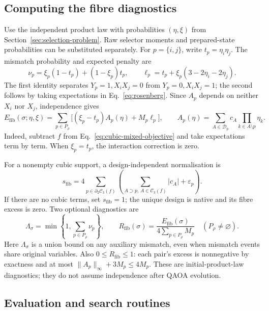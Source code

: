\documentclass[a4paper,onecolumn,11pt,unpublished]{quantumarticle}
\theoremstyle{remark}
\begin{document}
\subsection{Computing the fibre diagnostics}
\label{app:fibre-risk}

Use the independent product law with probabilities $(\eta,\xi)$ from
Section~\ref{sec:selection-problem}. Raw selector moments and prepared-state
probabilities can be substituted separately.
For $p=\{i,j\}$, write $t_p=\eta_i\eta_j$.  The mismatch probability and
expected penalty are
\begin{equation}
\nu_p=\xi_p(1-t_p)+(1-\xi_p)t_p,
\qquad
\ell_p=t_p+\xi_p(3-2\eta_i-2\eta_j).
\label{eq:fibre-violation-probability}
\end{equation}
The first identity separates $Y_p=1,X_iX_j=0$ from $Y_p=0,X_iX_j=1$;
the second follows by taking expectations in Eq.~\eqref{eq:rosenberg}.
Since $A_p$ depends on neither $X_i$ nor $X_j$, independence gives
\begin{equation}
E_{\mathrm{fib}}(\sigma;\eta,\xi)
=\sum_{p\in P_\rho}\bigl[(\xi_p-t_p)A_p(\eta)+M_p\ell_p\bigr],
\qquad
A_p(\eta)=\sum_{A\in\mathcal D_p}c_A\prod_{k\in A\setminus p}\eta_k.
\label{eq:fibre-excess-full}
\end{equation}
Indeed, subtract $f$ from Eq.~\eqref{eq:cubic-mixed-objective} and take
expectations term by term.  When $\xi_p=t_p$, the interaction correction is zero.

For a nonempty cubic support, a design-independent normalisation is
\[
s_{\mathrm{fib}}=4\sum_{p\in\partial_2\mathcal C_3(f)}
\left(\sum_{A\supset p,\,A\in\mathcal C_3(f)}|c_A|+\varepsilon_p\right).
\]
If there are no cubic terms, set $s_{\mathrm{fib}}=1$; the unique design is
native and its fibre excess is zero.  Two optional diagnostics are
\[
\Lambda_\sigma=\min\left\{1,\sum_{p\in P_\rho}\nu_p\right\},
\qquad
R_{\mathrm{fib}}(\sigma)=\frac{E_{\mathrm{fib}}(\sigma)}
{4\sum_{p\in P_\rho}M_p}\quad(P_\rho\neq\varnothing).
\]
Here $\Lambda_\sigma$ is a union bound on any auxiliary mismatch, even when
mismatch events share original variables.  Also $0\leq R_{\mathrm{fib}}\leq1$:
each pair's excess is nonnegative by exactness and at most
$\|A_p\|_\infty+3M_p\leq4M_p$.  These are initial-product-law diagnostics;
they do not assume independence after QAOA evolution.

\subsection{Evaluation and search routines}
\label{app:selector-details}
\end{document}
